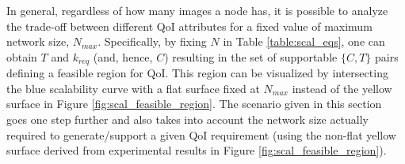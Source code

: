 In general, regardless of how many images a node has, it is possible to analyze the trade-off between different QoI attributes for a fixed value of maximum network size, $N_{max}$.  Specifically, by fixing $N$ in Table \ref{table:scal_eqs},
one can obtain $T$ and $k_{req}$ (and, hence, $C$) resulting in the set of supportable $\{C,T\}$ pairs defining a feasible region for QoI. This region can be visualized by intersecting the blue scalability curve with a flat surface fixed at $N_{max}$ instead of the yellow surface in Figure \ref{fig:scal_feasible_region}.  The scenario given in this section goes one step further and also takes into account  the network size actually required to generate/support a given QoI requirement (using the non-flat yellow surface derived from experimental results in Figure \ref{fig:scal_feasible_region}).
